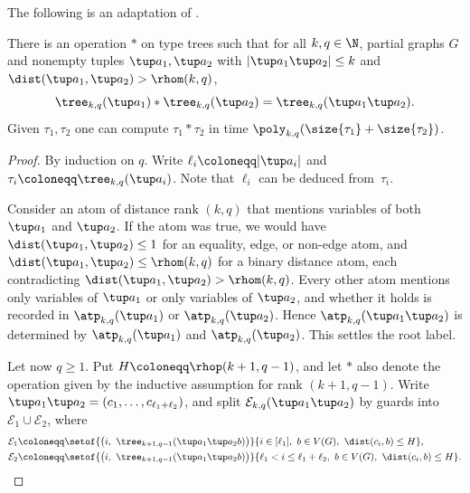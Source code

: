 The following is an adaptation of \cite[Lemma~3.1]{locality-note}.
\begin{lemma}\label{lem:compose}
There is an operation $\ast$ on type trees
such that for all \(k,q\in\N\), partial graphs \(G\) and
nonempty tuples $\tup a_1,\tup a_2$ with $|\tup a_1\tup a_2|\le k$ and $\dist(\tup a_1,\tup a_2)>\rhom(k,q)$,
\[
\tree_{k,q}(\tup a_1)\ast\tree_{k,q}(\tup a_2)
=
\tree_{k,q}(\tup a_1\tup a_2).
\]
Given $\tau_1,\tau_2$ one can compute $\tau_1\ast\tau_2$ in time $\poly_{k,q}(\size{\tau_1}+\size{\tau_2})$.
\end{lemma}
\begin{proof}
By induction on $q$.
Write $\ell_i\coloneqq|\tup a_i|$ and $\tau_i\coloneqq\tree_{k,q}(\tup a_i)$. Note that \(\ell_i\) can be deduced from~$\tau_i$.

Consider an atom of distance rank $(k,q)$ that mentions variables of both $\tup a_1$ and $\tup a_2$.
If the atom was true, we would have $\dist(\tup a_1,\tup a_2)\le1$ for an equality, edge, or non-edge atom, and $\dist(\tup a_1,\tup a_2)\le\rhom(k,q)$ for a binary distance atom, each contradicting $\dist(\tup a_1,\tup a_2)>\rhom(k,q)$.
Every other atom mentions only variables of $\tup a_1$ or only variables of $\tup a_2$, and whether it holds is recorded in $\atp_{k,q}(\tup a_1)$ or $\atp_{k,q}(\tup a_2)$.
Hence $\atp_{k,q}(\tup a_1\tup a_2)$ is determined by $\atp_{k,q}(\tup a_1)$ and $\atp_{k,q}(\tup a_2)$.
This settles the root label.

Let now \(q \ge 1\).
Put $H\coloneqq\rhop(k+1,q-1)$, and let $\ast$ also denote the operation given by the inductive assumption for rank $(k+1,q-1)$.
Write $\tup a_1\tup a_2=(c_1,\ldots,c_{\ell_1+\ell_2})$, and split $\mathcal E_{k,q}(\tup a_1\tup a_2)$ by guards into $\mathcal E_1\cup\mathcal E_2$, where
\begin{align*}
\mathcal E_1&\coloneqq\setof{\bigl(i,\ \tree_{k+1,q-1}(\tup a_1\tup a_2 b)\bigr)}{i\in[\ell_1],\ b\in V(G),\ \dist(c_i,b)\le H},\\
\mathcal E_2&\coloneqq\setof{\bigl(i,\ \tree_{k+1,q-1}(\tup a_1\tup a_2 b)\bigr)}{\ell_1<i\le\ell_1+\ell_2,\ b\in V(G),\ \dist(c_i,b)\le H}.
\end{align*}


\end{proof}
